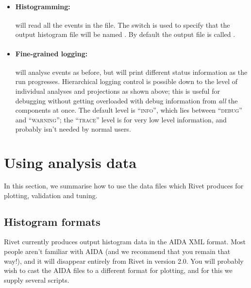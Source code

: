 \documentclass{JHEP3}
\begin{document}
\begin{itemize}
\item \paragraph{Histogramming:}{ will read all the
    events in the  file. The  switch is used to
    specify that the output histogram file will be named . By
    default the output file is called .}

\item \paragraph{Fine-grained logging:}{
    will analyse events as before, but will print different status
    information as the run progresses. Hierarchical logging control is possible
    down to the level of individual analyses and projections as shown above;
    this is useful for debugging without getting overloaded with debug
    information from \emph{all} the components at once. The default level is
    ``\textsc{info}'', which lies between ``\textsc{debug}'' and
    ``\textsc{warning}''; the ``\textsc{trace}'' level is for very low level
    information, and probably isn't needed by normal users.}

\end{itemize}



\section{Using analysis data}

In this section, we summarise how to use the data files which Rivet produces for
plotting, validation and tuning.

\subsection{Histogram formats}

Rivet currently produces output histogram data in the AIDA XML format. Most
people aren't familiar with AIDA (and we recommend that you remain that way!),
and it will disappear entirely from Rivet in version 2.0. You will probably
wish to cast the AIDA files to a different format for plotting, and for this we
supply several scripts.
\end{document}
